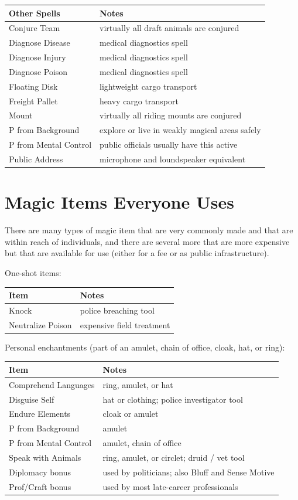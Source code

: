 \begin{tabular}{ll}\hline
\textbf{Other Spells} & \textbf{Notes} \\ \hline
Conjure Team & virtually all draft animals are conjured \\
Diagnose Disease & medical diagnostics spell \\
Diagnose Injury & medical diagnostics spell \\
Diagnose Poison & medical diagnostics spell \\
Floating Disk & lightweight cargo transport \\
Freight Pallet & heavy cargo transport \\
Mount & virtually all riding mounts are conjured \\
P from Background & explore or live in weakly magical areas safely \\
P from Mental Control & public officials usually have this active \\
Public Address & microphone and loundspeaker equivalent \\
\hline
\end{tabular}
%

%
\section{Magic Items Everyone Uses}

There are many types of magic item that are very commonly made and that are
within reach of individuals, and there are several more that are more
expensive but that are available for use (either for a fee or as public
infrastructure).

One-shot items:

\begin{tabular}{ll} \hline
\textbf{Item} & \textbf{Notes} \\ \hline
Knock & police breaching tool \\
Neutralize Poison & expensive field treatment \\
\hline
\end{tabular}

Personal enchantments (part of an amulet, chain of office, cloak, hat, or
ring):

\begin{tabular}{ll} \hline
\textbf{Item} & \textbf{Notes} \\ \hline
Comprehend Languages & ring, amulet, or hat \\
Disguise Self & hat or clothing; police investigator tool \\
Endure Elements & cloak or amulet \\
P from Background & amulet \\
P from Mental Control & amulet, chain of office \\
Speak with Animals & ring, amulet, or circlet; druid / vet tool \\
\hline
Diplomacy bonus & used by politicians; also Bluff and Sense Motive \\
Prof/Craft bonus & used by most late-career professionals \\
\hline
\end{tabular}

